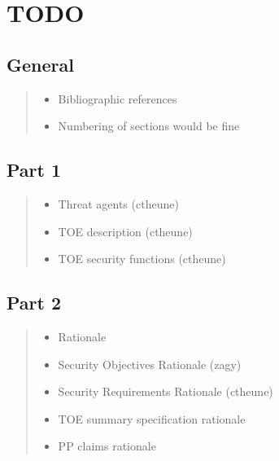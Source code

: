 \documentclass[10pt,a4paper,english]{scrbook}
\begin{document}

\hypertarget{todo}{}
\chapter{TODO}



\hypertarget{general}{}
\section{General}
\begin{quote}
\begin{itemize}
\item {} 
Bibliographic references

\item {} 
Numbering of sections would be fine

\end{itemize}
\end{quote}



\hypertarget{part-1}{}
\section{Part 1}
\begin{quote}
\begin{itemize}
\item {} 
Threat agents (ctheune)

\item {} 
TOE description (ctheune)

\item {} 
TOE security functions (ctheune)

\end{itemize}
\end{quote}



\hypertarget{part-2}{}
\section{Part 2}
\begin{quote}
\begin{itemize}
\item {} 
Rationale

\item {} 
Security Objectives Rationale (zagy)

\item {} 
Security Requirements Rationale (ctheune)

\item {} 
TOE summary specification rationale

\item {} 
PP claims rationale

\end{itemize}
\end{quote}
\end{document}
